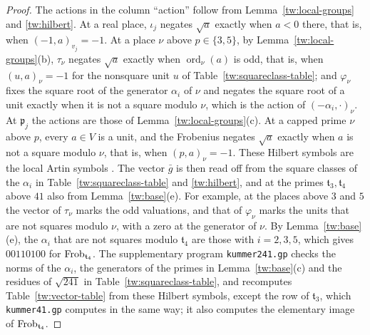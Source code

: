 \begin{proof}
The actions in the column ``action'' follow from
Lemma~\ref{tw:local-groups} and \eqref{tw:hilbert}. At a real place,
$\iota_j$ negates $\sqrt a$ exactly when $a<0$ there, that is, when
$(-1,a)_{v_j}=-1$. At a place $\nu$ above $p\in\{3,5\}$, by
Lemma~\ref{tw:local-groups}(b), $\tau_\nu$ negates $\sqrt a$ exactly when
$\operatorname{ord}_\nu(a)$ is odd, that is, when $(u,a)_\nu=-1$ for the
nonsquare unit $u$ of Table~\ref{tw:squareclass-table}; and $\varphi_\nu$
fixes the square root of the generator $\alpha_i$ of $\nu$ and negates the
square root of a unit exactly when it is not a square modulo $\nu$, which is
the action of $(-\alpha_i,\cdot)_\nu$. At $\mathfrak p_j$ the actions are
those of Lemma~\ref{tw:local-groups}(c). At a capped prime $\nu$ above $p$,
every $a\in V$ is a unit, and the Frobenius negates $\sqrt a$ exactly when
$a$ is not a square modulo $\nu$, that is, when $(p,a)_\nu=-1$. These
Hilbert symbols are the local Artin symbols
\cite[Chapter~III, Remark~4.5]{MilneCFT}. The vector $\bar g$
is then read off from the square classes of the $\alpha_i$ in
Table~\ref{tw:squareclass-table} and \eqref{tw:hilbert}, and at the primes
$\mathfrak t_3,\mathfrak t_4$ above $41$ also from Lemma~\ref{tw:base}(e). For example, at the places above $3$ and
$5$ the vector of $\tau_\nu$ marks the odd valuations, and that of
$\varphi_\nu$ marks the units that are not squares modulo $\nu$, with a zero
at the generator of $\nu$. By Lemma~\ref{tw:base}(e), the $\alpha_i$ that are
not squares modulo $\mathfrak t_4$ are those with $i=2,3,5$, which gives
$00110100$ for $\operatorname{Frob}_{\mathfrak t_4}$. The supplementary program
\texttt{kummer241.gp} checks the norms of the $\alpha_i$, the generators of
the primes in Lemma~\ref{tw:base}(c) and the residues of $\sqrt{241}$ in
Table~\ref{tw:squareclass-table}, and recomputes
Table~\ref{tw:vector-table} from these Hilbert symbols, except the row of
$\mathfrak t_3$, which \texttt{kummer41.gp} computes in the same way; it also
computes the elementary image of $\operatorname{Frob}_{\mathfrak t_4}$.
\end{proof}

